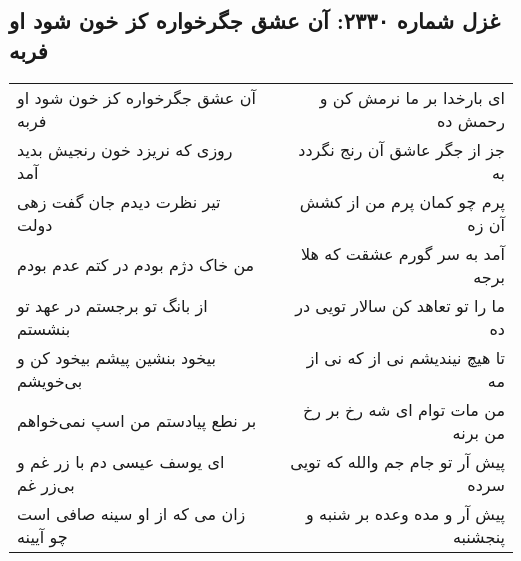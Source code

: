 \begin{center}
\section*{غزل شماره ۲۳۳۰: آن عشق جگرخواره کز خون شود او فربه}
\label{sec:2330}
\begin{longtable}{l p{0.5cm} r}
آن عشق جگرخواره کز خون شود او فربه
&&
ای بارخدا بر ما نرمش کن و رحمش ده
\\
روزی که نریزد خون رنجیش بدید آمد
&&
جز از جگر عاشق آن رنج نگردد به
\\
تیر نظرت دیدم جان گفت زهی دولت
&&
پرم چو کمان پرم من از کشش آن زه
\\
من خاک دژم بودم در کتم عدم بودم
&&
آمد به سر گورم عشقت که هلا برجه
\\
از بانگ تو برجستم در عهد تو بنشستم
&&
ما را تو تعاهد کن سالار تویی در ده
\\
بیخود بنشین پیشم بیخود کن و بی‌خویشم
&&
تا هیچ نیندیشم نی از که نی از مه
\\
بر نطع پیادستم من اسپ نمی‌خواهم
&&
من مات توام ای شه رخ بر رخ من برنه
\\
ای یوسف عیسی دم با زر غم و بی‌زر غم
&&
پیش آر تو جام جم والله که تویی سرده
\\
زان می که از او سینه صافی است چو آیینه
&&
پیش آر و مده وعده بر شنبه و پنجشنبه
\\
\end{longtable}
\end{center}

